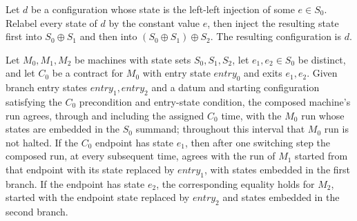 \begin{lemma}
\label{Turing.Contract.mapState_const_inl_inl}
\leanok
{}
Let $d$ be a configuration whose state is the left-left injection of some $e\in S_0$.
Relabel every state of $d$ by the constant value $e$, then inject the resulting state
first into $S_0\oplus S_1$ and then into $(S_0\oplus S_1)\oplus S_2$. The resulting
configuration is $d$.
\end{lemma}

\begin{lemma}
\label{Turing.Contract.branch_traj}
\leanok
{}
Let $M_0,M_1,M_2$ be machines with state sets $S_0,S_1,S_2$, let $e_1,e_2\in S_0$ be
distinct, and let $C_0$ be a contract for $M_0$ with entry state $entry_0$ and exits
$e_1,e_2$. Given branch entry states $entry_1,entry_2$ and a datum and starting
configuration satisfying the $C_0$ precondition and entry-state condition, the composed
machine's run agrees, through and including the assigned $C_0$ time, with the $M_0$ run
whose states are embedded in the $S_0$ summand; throughout this interval that $M_0$ run
is not halted. If the $C_0$ endpoint has state $e_1$, then after one switching step the
composed run, at every subsequent time, agrees with the run of $M_1$ started from that
endpoint with its state replaced by $entry_1$, with states embedded in the first branch.
If the endpoint has state $e_2$, the corresponding equality holds for $M_2$, started
with the endpoint state replaced by $entry_2$ and states embedded in the second branch.
\end{lemma}

